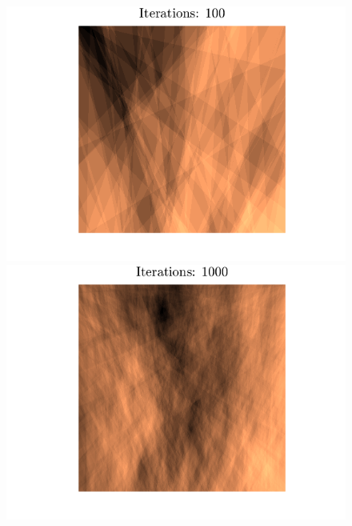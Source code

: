 \begin{figure}[h]
    \centering
    \includegraphics[width=\linewidth]{img/lines1e2.png}
\endminipage\hfill
{}
    \centering
    \includegraphics[width=\linewidth]{img/lines1e3.png}
\endminipage\hfill


\end{figure}
